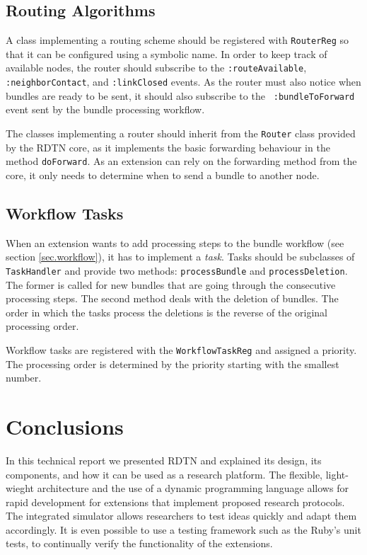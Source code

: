 \documentclass[a4paper]{article}
\begin{document}
\subsection{Routing Algorithms}\label{sec.ext.routing}

A class implementing a routing scheme should be registered with {\tt RouterReg}
so that it can be configured using a symbolic name. In order to keep track of
available nodes, the router should subscribe to the {\tt :routeAvailable}, {\tt
:neighborContact}, and {\tt :linkClosed} events. As the router must also notice
when bundles are ready to be sent, it should also subscribe to the {\tt
:bundleToForward} event sent by the bundle processing workflow.

The classes implementing a router should inherit from the {\tt Router} class
provided by the RDTN core, as it implements the basic forwarding behaviour in
the method {\tt doForward}.  As an extension can rely on the forwarding method
from the core, it only needs to determine when to send a bundle to another node.

\subsection{Workflow Tasks}\label{sec.ext.workflow}

When an extension wants to add processing steps to the bundle workflow (see
section \ref{sec.workflow}), it has to implement a {\em task}. Tasks should be
subclasses of {\tt TaskHandler} and provide two methods: {\tt processBundle} and
{\tt processDeletion}. The former is called for new bundles that are going
through the consecutive processing steps. The second method deals with the
deletion of bundles. The order in which the tasks process the deletions is
the reverse of the original processing order.

Workflow tasks are registered with the {\tt WorkflowTaskReg} and assigned a
priority. The processing order is determined by the priority starting with the
smallest number.

\section{Conclusions}\label{sec.conclusions}

In this technical report we presented RDTN and explained its design, its
components, and how it can be used as a research platform. The flexible,
light-wieght architecture and the use of a dynamic programming language allows
for rapid development for extensions that implement proposed research protocols.
The integrated simulator allows researchers to test ideas quickly and
adapt them accordingly. It is even possible to use a testing framework such as
the Ruby's unit tests, to continually verify the functionality of the
extensions.
\end{document}
